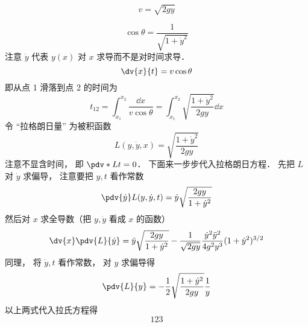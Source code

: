 

\begin{equation}
v = \sqrt{2gy}
\end{equation}

\begin{equation}
\cos\theta = \frac{1}{\sqrt{1 + \dot{y}^2}}
\end{equation}
注意 $\dot{y}$ 代表 $y(x)$ 对 $x$ 求导而不是对时间求导．
\begin{equation}
\dv{x}{t} = v\cos\theta
\end{equation}
即从点 1 滑落到点 2 的时间为
\begin{equation}
t_{12} = \int_{x_1}^{x_2} \frac{\dd{x}}{v\cos\theta} = \int_{x_1}^{x_2} \sqrt{\frac{1 + \dot{y}^2}{2gy}} \dd{x}
\end{equation}
令 “拉格朗日量” 为被积函数
\begin{equation}
L(y, \dot y, x) = \sqrt{\frac{1 + \dot{y}^2}{2gy}}
\end{equation}
注意不显含时间， 即 $\pdv*{L}{t} = 0$． 下面来一步步代入拉格朗日方程． 先把 $L$ 对 $\dot{y}$ 求偏导， 注意要把 $y, t$ 看作常数
\begin{equation}
\pdv{\dot{y}}L(y, \dot{y}, t) = \dot y\sqrt{\frac{2gy}{1+\dot{y}^2}}
\end{equation}
然后对 $x$ 求全导数（把 $y, \dot{y}$ 看成 $x$ 的函数）
\begin{equation}
\dv{x}\pdv{L}{\dot{y}} = \ddot{y}\sqrt{\frac{2gy}{1+\dot{y}^2}} - \frac{1}{\sqrt{2gy}}\frac{\dot{y}^2\ddot{y}^2}{4g^2y^3}(1+\dot{y}^2)^{3/2}
\end{equation}
同理， 将 $\dot y, t$ 看作常数， 对 $y$ 求偏导得
\begin{equation}
\pdv{L}{y} = -\frac{1}{2} \sqrt{\frac{1 + \dot{y}^2}{2gy}} \frac{1}{y}
\end{equation}
以上两式代入拉氏方程得
\begin{equation}
123
\end{equation}

